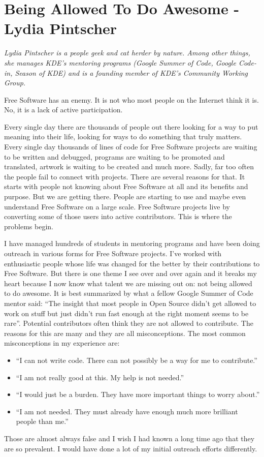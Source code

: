 \chapter{Being Allowed To Do Awesome - Lydia Pintscher}

\textit{Lydia Pintscher is a people geek and cat herder by nature. Among other
things, she manages KDE's mentoring programs (Google Summer of Code, Google
Code-in, Season of KDE) and is a founding member of KDE's Community Working
Group.}

Free Software has an enemy. It is not who most people on the Internet think it
is. No, it is a lack of active participation.

Every single day there are thousands of people out there looking for a way to
put meaning into their life, looking for ways to do something that truly
matters. Every single day thousands of lines of code for Free Software projects
are waiting to be written and debugged, programs are waiting to be promoted and
translated, artwork is waiting to be created and much more. Sadly, far too often
the people fail to connect with projects. There are several reasons for
that. It starts with people not knowing about Free Software at all and its
benefits and purpose. But we are getting there. People are starting to use and
maybe even understand Free Software on a large scale. Free Software projects
live by converting some of those users into active contributors. This is where
the problems begin.

I have managed hundreds of students in mentoring programs and have been doing
outreach in various forms for Free Software projects. I've worked with
enthusiastic people whose life was changed for the better by their contributions
to Free Software. But there is one theme I see over and over again and it breaks
my heart because I now know what talent we are missing out on: not being allowed
to do awesome. It is best summarized by what a fellow Google Summer of Code
mentor said: ``The insight that most people in Open Source didn’t get allowed to
work on stuff but just didn’t run fast enough at the right moment seems to be
rare''. Potential contributors often think they are not allowed to contribute.
The reasons for this are many and they are all misconceptions. The most common
misconceptions in my experience are:
\begin{itemize}
 \item ``I can not write code. There can not possibly be a way for me to
contribute.''
 \item ``I am not really good at this. My help is not needed.''
 \item ``I would just be a burden. They have more important things to worry
about.''
 \item ``I am not needed. They must already have enough much more brilliant
people than me.''
\end{itemize}
Those are almost always false and I wish I had known a long time ago that they
are so prevalent. I would have done a lot of my initial outreach efforts
differently.

